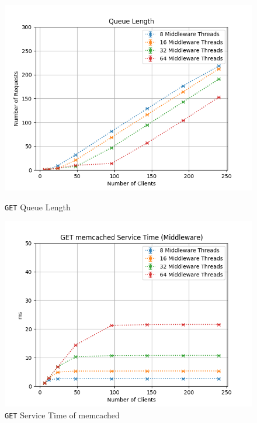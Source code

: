 \documentclass[11pt,a4paper]{article}
\begin{document}
\begin{figure}[H]
	\centering
	\captionsetup{width=0.4\textwidth}
    \begin{minipage}{0.5\textwidth}
        \includegraphics[width=\textwidth]{../illustrations/plots/2_1_one_middleware/0-1/middleware_queue_length.png}
        \caption{\texttt{GET} Queue Length}
        \label{fig:one_middleware_get_ql}
    \end{minipage}\hfill
    \begin{minipage}{0.5\textwidth}
        \centering
        \includegraphics[width=\textwidth]{../illustrations/plots/2_1_one_middleware/0-1/middleware_get_service_time_ms.png}
        \caption{\texttt{GET} Service Time of memcached}
        \label{fig:one_middleware_get_st_mw}
    \end{minipage}
\end{figure}
\end{document}
